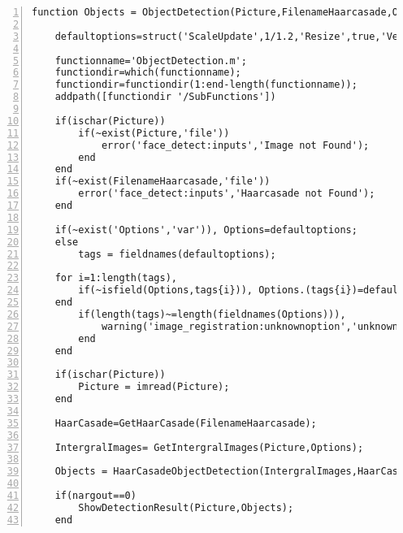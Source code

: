 \begin{lstlisting}[style=Matlab-editor, numbers=left,label={lst:ObjectDetection},captionpos=b, caption={Code \textbf{ObjectDetection.m} }]
	function Objects = ObjectDetection(Picture,FilenameHaarcasade,Options)
	
	defaultoptions=struct('ScaleUpdate',1/1.2,'Resize',true,'Verbose',true);
	
	functionname='ObjectDetection.m';
	functiondir=which(functionname);
	functiondir=functiondir(1:end-length(functionname));
	addpath([functiondir '/SubFunctions'])

	if(ischar(Picture))
		if(~exist(Picture,'file'))
			error('face_detect:inputs','Image not Found');
		end
	end
	if(~exist(FilenameHaarcasade,'file'))
		error('face_detect:inputs','Haarcasade not Found');
	end

	if(~exist('Options','var')), Options=defaultoptions;
	else
		tags = fieldnames(defaultoptions);
		
	for i=1:length(tags),
		if(~isfield(Options,tags{i})), Options.(tags{i})=defaultoptions.(tags{i}); end
	end
		if(length(tags)~=length(fieldnames(Options))),
			warning('image_registration:unknownoption','unknown options found');
		end
	end

	if(ischar(Picture))
		Picture = imread(Picture);
	end

	HaarCasade=GetHaarCasade(FilenameHaarcasade);

	IntergralImages= GetIntergralImages(Picture,Options);
	
	Objects = HaarCasadeObjectDetection(IntergralImages,HaarCasade,Options);

	if(nargout==0)
		ShowDetectionResult(Picture,Objects);
	end
\end{lstlisting}